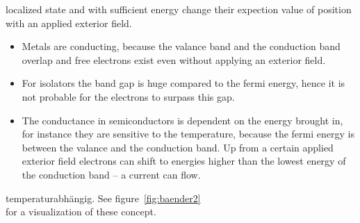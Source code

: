localized state and with sufficient energy change their expection value of position with an applied
exterior field.
\begin{itemize}
    \item Metals are conducting, because the valance band and the conduction band overlap and 
        free electrons exist even without applying an exterior field.
    \item For isolators the band gap is huge compared to the fermi energy, hence it is not probable for
        the electrons to surpass this gap.
    \item The conductance in semiconductors is dependent on the energy brought in, for instance they
        are sensitive to the temperature, because the fermi energy is between the valance and the
        conduction band. Up from a certain applied exterior field electrons can shift to energies
        higher than the lowest energy of the conduction band -- a current can flow.
\end{itemize}

temperaturabhängig. See figure~\ref{fig:baender2} \cite{demtroder2000experimentalphysik}\\ for
a visualization of these concept.

\newcommand{\picwidththeo}{0.48\textwidth}

